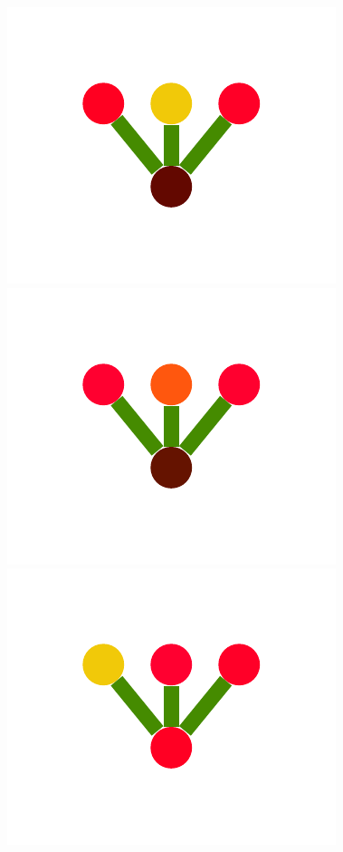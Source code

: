 \documentclass[a4paper,10pt]{article}
\begin{document}
\begin{figure}
{    \includegraphics[scale=.26]{../figures/vector/4-2-1-noisyprog-pre-6.pdf}
    \includegraphics[scale=.26]{../figures/vector/4-2-1-noisyprog-pre-7.pdf}
    \includegraphics[scale=.26]{../figures/vector/4-2-1-noisyprog-pre-8.pdf}
    \label{fig:noisy-orig}
    }
\end{figure}
\end{document}
